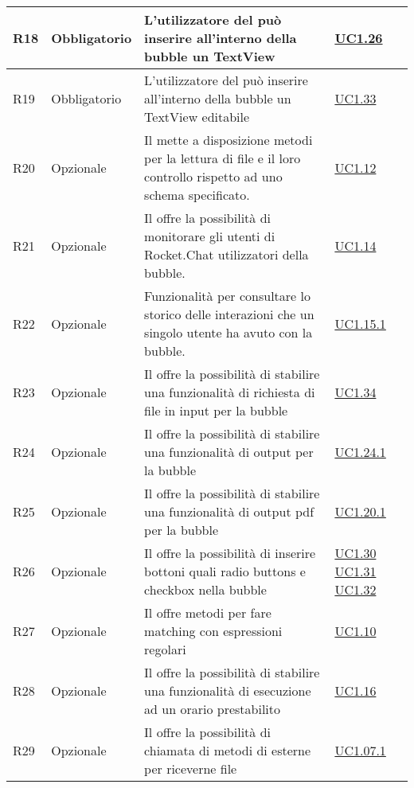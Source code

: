 \begin{longtable}{|P{1.5cm}|P{3cm}|P{6cm}|P{2.5cm}|}
	\hline R18 & Obbligatorio & L’utilizzatore del  può inserire all'interno della bubble un TextView & \hyperref[UC1.26]{UC1.26} \\
	\hline R19 & Obbligatorio & L’utilizzatore del  può inserire all'interno della bubble un TextView editabile & \hyperref[UC1.33]{UC1.33} \\
	\hline R20 & Opzionale & Il  mette a disposizione metodi per la lettura di file  e il loro controllo rispetto ad uno schema specificato. & \hyperref[UC1.12]{UC1.12} \\
	\hline R21 & Opzionale & Il  offre la possibilità di monitorare gli utenti di Rocket.Chat utilizzatori della bubble. & \hyperref[UC1.14]{UC1.14} \\
	\hline R22 & Opzionale & Funzionalità per consultare lo storico delle interazioni che un singolo utente ha avuto con la bubble. & \hyperref[UC1.15.1]{UC1.15.1} \\
	\hline R23 & Opzionale & Il  offre la possibilità di stabilire una funzionalità di richiesta di file in input per la bubble & \hyperref[UC1.34]{UC1.34} \\
	\hline R24 & Opzionale & Il  offre la possibilità di stabilire una funzionalità di output per la bubble & \hyperref[UC1.24.1]{UC1.24.1} \\
	\hline R25 & Opzionale & Il  offre la possibilità di stabilire una funzionalità di output pdf per la bubble & \hyperref[UC1.20.1]{UC1.20.1} \\	
	\hline R26 & Opzionale & Il  offre la possibilità di inserire bottoni quali radio buttons e checkbox nella bubble & \hyperref[UC1.30]{UC1.30} \linebreak \hyperref[UC1.31]{UC1.31} \linebreak \hyperref[UC1.32]{UC1.32} \\
	\hline R27 & Opzionale & Il  offre metodi per fare matching con espressioni regolari
	 & \hyperref[UC1.10]{UC1.10} \\
	\hline R28 & Opzionale & Il  offre la possibilità di stabilire una funzionalità di  esecuzione ad un orario prestabilito & \hyperref[UC1.16]{UC1.16} \\
	\hline R29 & Opzionale & Il  offre la possibilità di chiamata di metodi di  esterne per riceverne file  & \hyperref[UC1.07.1]{UC1.07.1} \\

\end{longtable}
